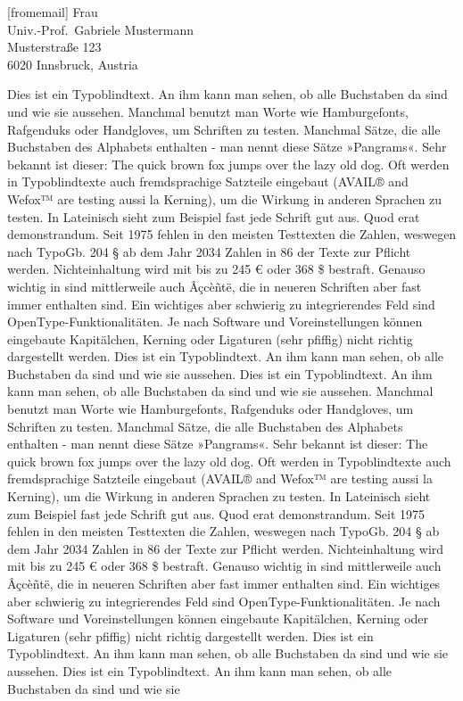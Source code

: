 \documentclass[ngerman,noconfig]{uibklttr}
\begin{document}
\begin{letter}[fromemail]{%
  Frau\\
  Univ.-Prof.~Gabriele Mustermann\\
  Musterstraße 123\\
  6020 Innsbruck, Austria}
\clearpage

Dies ist ein Typoblindtext. An ihm kann man sehen, ob alle Buchstaben da sind
und wie sie aussehen. Manchmal benutzt man Worte wie Hamburgefonts, Rafgenduks
oder Handgloves, um Schriften zu testen. Manchmal Sätze, die alle Buchstaben des
Alphabets enthalten - man nennt diese Sätze »Pangrams«. Sehr bekannt ist dieser:
The quick brown fox jumps over the lazy old dog. Oft werden in Typoblindtexte
auch fremdsprachige Satzteile eingebaut (AVAIL® and Wefox™ are testing aussi la
Kerning), um die Wirkung in anderen Sprachen zu testen. In Lateinisch sieht zum
Beispiel fast jede Schrift gut aus. Quod erat demonstrandum. Seit 1975 fehlen in
den meisten Testtexten die Zahlen, weswegen nach TypoGb. 204 § ab dem Jahr 2034
Zahlen in 86 der Texte zur Pflicht werden. Nichteinhaltung wird mit bis zu 245 €
oder 368 \$ bestraft.  Genauso wichtig in sind mittlerweile auch Âçcèñtë, die in
neueren Schriften aber fast immer enthalten sind. Ein wichtiges aber schwierig
zu integrierendes Feld sind OpenType-Funktionalitäten. Je nach Software und
Voreinstellungen können eingebaute Kapitälchen, Kerning oder Ligaturen (sehr
pfiffig) nicht richtig dargestellt werden.  Dies ist ein Typoblindtext. An ihm
kann man sehen, ob alle Buchstaben da sind und wie sie aussehen.  Dies ist ein
Typoblindtext. An ihm kann man sehen, ob alle Buchstaben da sind und wie sie
aussehen. Manchmal benutzt man Worte wie Hamburgefonts, Rafgenduks oder
Handgloves, um Schriften zu testen. Manchmal Sätze, die alle Buchstaben des
Alphabets enthalten - man nennt diese Sätze »Pangrams«. Sehr bekannt ist dieser:
The quick brown fox jumps over the lazy old dog. Oft werden in Typoblindtexte
auch fremdsprachige Satzteile eingebaut (AVAIL® and Wefox™ are testing aussi la
Kerning), um die Wirkung in anderen Sprachen zu testen. In Lateinisch sieht zum
Beispiel fast jede Schrift gut aus. Quod erat demonstrandum. Seit 1975 fehlen in
den meisten Testtexten die Zahlen, weswegen nach TypoGb. 204 § ab dem Jahr 2034
Zahlen in 86 der Texte zur Pflicht werden. Nichteinhaltung wird mit bis zu 245 €
oder 368 \$ bestraft.  Genauso wichtig in sind mittlerweile auch Âçcèñtë, die in
neueren Schriften aber fast immer enthalten sind. Ein wichtiges aber schwierig
zu integrierendes Feld sind OpenType-Funktionalitäten. Je nach Software und
Voreinstellungen können eingebaute Kapitälchen, Kerning oder Ligaturen (sehr
pfiffig) nicht richtig dargestellt werden.  Dies ist ein Typoblindtext. An ihm
kann man sehen, ob alle Buchstaben da sind und wie sie aussehen. Dies ist ein
Typoblindtext. An ihm kann man sehen, ob alle Buchstaben da sind und wie sie

\end{letter}
\end{document}
